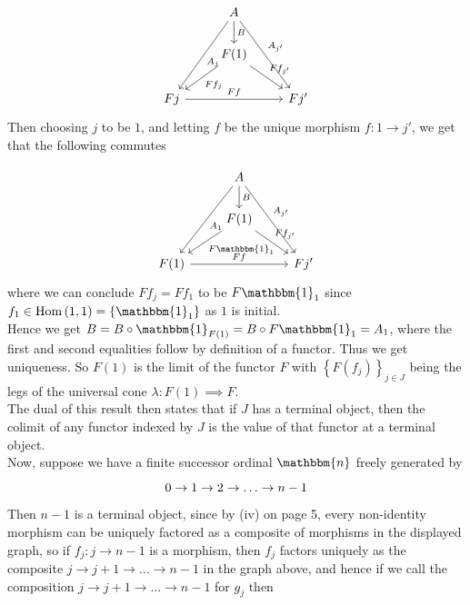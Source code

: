 \documentclass[a4paper]{article}
\DeclareMathOperator{\Hom}{Hom}
\begin{document}
\begin{equation}
\begin{tikzcd}
    & A \ar[ddl, "A_j"] \ar[ddr, "A_{j'}"] \ar[d, "B"] &\\
    & F(1) \ar[dl, "Ff_j"] \ar[dr, "Ff_{j'}"] &\\
    Fj \ar[rr, "Ff"] & & Fj'
\end{tikzcd}
\end{equation}
Then choosing $j$ to be $1$, and
letting $f$ be the unique morphism $f  \colon 1 \to j'$, we get that
the following commutes

\begin{equation}
\begin{tikzcd}
    & A \ar[ddl, "A_1"] \ar[ddr, "A_{j'}"] \ar[d, "B"] &\\
    & F(1) \ar[dl, "F \mathbbm{1}_{1}"] \ar[dr, "Ff_{j'}"] &\\
    F(1) \ar[rr, "Ff"] & & Fj'
\end{tikzcd}
\end{equation}
where we can conclude $F f_j = F f_{1}$ to be $F \mathbbm{1}_1$ since
$f_1 \in \Hom\left( 1, 1 \right) 
= \left\{ \mathbbm{1}_1 \right\} $ as $1$ is initial.\\
Hence we get $B = B \circ \mathbbm{1}_{F(1)} = B \circ F \mathbbm{1}_1 = A_1$,
where
the first and second equalities follow by definition of a functor. Thus we get
uniqueness. So
$F(1)$ is the limit of the functor $F$ with
$\left\{ F(f_j) \right\}_{j \in J}$ being the legs of the universal cone
$\lambda  \colon F(1) \implies F$.\\
\linebreak
The dual of this result then states that
if $J$ has a terminal object, then the colimit of any functor
indexed by $J$ is the value of that functor at a terminal object.\\
\linebreak
Now, suppose we have a finite successor ordinal $\mathbbm{n}$ freely generated
by
\begin{equation*}
\begin{tikzcd}
    0 \to 1 \to 2 \to \ldots \to n-1
\end{tikzcd}
\end{equation*}
Then $n-1$ is a terminal object, since by (iv) on page 5, every non-identity
morphism can be uniquely factored as a composite of morphisms in the displayed
graph, so
if $f_j  \colon j \to n-1$ is a morphism, then
$f_j$ factors uniquely as the composite
$j \to j+1 \to \ldots \to  n-1$ in the graph above, and hence
if we call the composition $j\to j+1 \to \ldots \to n-1$ for $g_j$ then
\end{document}

